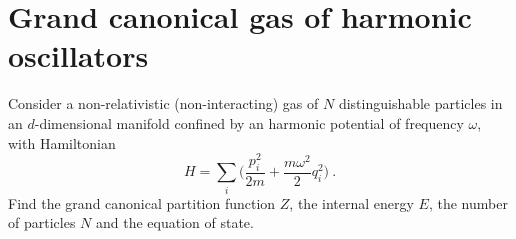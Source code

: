 \section{Grand canonical gas of harmonic oscillators}

    \begin{exercise}
        Consider a non-relativistic (non-interacting) gas of $N$ distinguishable particles in an $d$-dimensional manifold confined by an harmonic potential of frequency $\omega$, with Hamiltonian 
        \begin{equation*}
            H = \sum_i \Big ( \frac{p^2_i}{2m} + \frac{m \omega^2}{2} q_i^2 \Big ) ~.
        \end{equation*}
        Find the grand canonical partition function $Z$, the internal energy $E$, the number of particles $N$ and the equation of state.
    \end{exercise}


